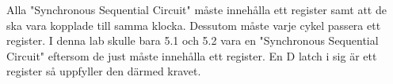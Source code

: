 \documentclass[11pt]{article}
\begin{document}
\subsubsection{}
\label{sec:orgheadline19}
Alla "Synchronous Sequential Circuit" måste innehålla ett register samt att de ska vara kopplade till samma klocka. Dessutom måste varje cykel passera ett register. I denna lab skulle bara 5.1 och 5.2 vara 
en "Synchronous Sequential Circuit" eftersom de just måste innehålla ett register. En D latch i sig är ett register så uppfyller den därmed kravet. 
\end{document}
